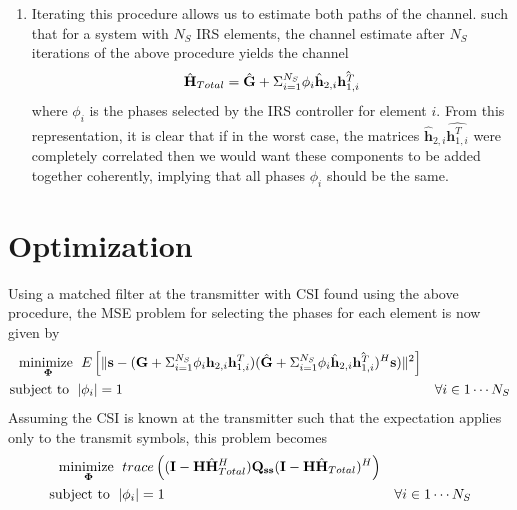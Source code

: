 \documentclass[12pt,a4paper]{report}
\begin{document}
\begin{enumerate}
	\item 
		Iterating this procedure allows us to estimate both paths of the channel. 
		such that for a system with $N_S$ IRS elements, the channel estimate after $N_S$ iterations of the above procedure yields the channel 
				\begin{equation*}
				\hat{\mathbf{H}}_{Total} = \hat{\mathbf{G}} + \Sigma_{i=1}^{N_S} \phi_i \hat{\mathbf{h}}_{2,i}\hat{\mathbf{h}^T_{1,i}} 
				\end{equation*}
				where $\phi_i$ is the phases selected by the IRS controller for element $i$. 
		From this representation, it is clear that if in the worst case, the matrices $\hat{\mathbf{h}}_{2,i}\hat{\mathbf{h}^T_{1,i}}$ were completely correlated
		then we would want these components to be added together coherently, implying that all phases $\phi_i$ should be the same.
	\end{enumerate}
	
\section{Optimization}
Using a matched filter at the transmitter with CSI found using the above procedure, the MSE problem for selecting the phases for each element is now given by
	\begin{subequations}
	\label{optim}
	\begin{align}
	    \underset{\boldsymbol{\Phi}}{\text{minimize }}
	    & \; E\left[\|  \mathbf{s} - (\mathbf{G} + \Sigma_{i=1}^{N_S} \phi_i \mathbf{h}_{2,i}\mathbf{h}^T_{1,i})(\hat{\mathbf{G}} + \Sigma_{i=1}^{N_S} \phi_i \hat{\mathbf{h}}_{2,i}\hat{\mathbf{h}^T_{1,i}})^H\mathbf{s}) \|^2 \right]\\
	    \text{subject to  } \; &
	    | \phi_i | = 1 & \forall i \in {1 \cdots	 N_S}
	\end{align}
	\end{subequations}	
	Assuming the CSI is known at the transmitter such that the expectation applies only to the transmit symbols, this problem becomes
	\begin{subequations}
	\label{optim}
	\begin{align}
	    \underset{\boldsymbol{\Phi}}{\text{minimize }}
	    & \; trace\left((\mathbf{I} - \mathbf{H}\hat{\mathbf{H}}_{Total}^H) \mathbf{Q}_{\mathbf{s}\mathbf{s}} 
	    (\mathbf{I} - \mathbf{H}\hat{\mathbf{H}}_{Total}) ^H\right)
	     \\
	    \text{subject to  } \; &
	    | \phi_i | = 1 & \forall i \in {1 \cdots	 N_S}
	\end{align}
	\end{subequations}		
	
\end{document}

